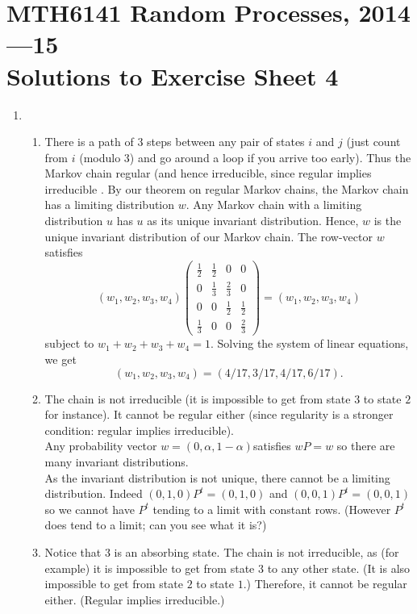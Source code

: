 \documentclass[11pt,a4paper]{article}
\begin{document}
    \section*{MTH6141 Random Processes, 2014—15\\Solutions to Exercise Sheet 4}
    \begin{enumerate}
        \item 
        \begin{enumerate}
            \item There is a path of $3$ steps between any pair of states $i$ and $j$ (just count from $i$ (modulo $3$) and go around a loop if you arrive too early). Thus the Markov chain regular (and hence irreducible, since regular implies irreducible . By our theorem on regular Markov chains, the Markov chain has a limiting distribution $w$. Any Markov chain with a limiting distribution $u$ has $u$ as its unique invariant distribution. Hence, $w$ is the unique invariant distribution of our Markov chain. The row-vector $w$ satisfies
            $$
            (w_1, w_2, w_3,w_4)
            \begin{pmatrix}
                \frac{1}{2} & \frac{1}{2} & 0 & 0\\
                0 & \frac{1}{3} & \frac{2}{3} & 0\\
                0 & 0 & \frac{1}{2} & \frac{1}{2}\\
                \frac{1}{3} & 0 & 0 & \frac{2}{3}
            \end{pmatrix}
            =
            (w_1, w_2, w_3, w_4)
            $$
            subject to $w_1 + w_2 + w_3 + w_4 = 1$. Solving the system of linear equations, we get
            $$
            (w_1, w_2, w_3,w_4) = (4/17, 3/17, 4/17, 6/17).
            $$
            \item The chain is not irreducible (it is impossible to get from state $3$ to state $2$ for instance). It cannot be regular either (since regularity is a stronger condition: regular implies irreducible).\\
            Any probability vector $w = (0, \alpha, 1-\alpha)$satisfies $wP = w$ so there are many invariant distributions.\\
            As the invariant distribution is not unique, there cannot be a limiting distribution. Indeed $(0, 1, 0)P^t = (0, 1, 0)$ and $(0, 0, 1)P^t = (0, 0, 1)$ so we cannot have $P^t$ tending to a limit with constant rows. (However $P^t$ does tend to a limit; can you see what it is?)
            \item Notice that $3$ is an absorbing state. The chain is not irreducible, as (for example) it is impossible to get from state $3$ to any other state. (It is also impossible to get from state $2$ to state $1$.) Therefore, it cannot be regular either. (Regular implies irreducible.)\\

\end{enumerate}
\end{enumerate}
\end{document}
